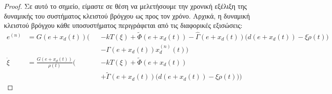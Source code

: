 \begin{proof}
Σε αυτό το σημείο, είμαστε σε θέση να μελετήσουμε την χρονική εξέλιξη της δυναμικής του συστήματος κλειστού βρόγχου ως προς τον χρόνο. Αρχικά, η δυναμική κλειστού βρόγχου κάθε υποσυστήματος περιγράφεται από τις διαφορικές εξισώσεις:
\begin{equation}
\begin{alignedat}{2}
	e^{(n)} &= G(e + x_d(t)) \Big( &&-k T(\xi ) 
	+ \tilde{\Phi}(e + x_d(t)) 
	-\hat{\Gamma}(e + x_d(t)) \big( d(e + x_d(t)) - \xi \dot{\rho}(t) \big)  \\
	& &&- \Gamma(e + x_d(t)) x_d^{(n)}(t) \Big)   \\
	\dot{\xi} &= \frac{G(e + x_d(t))}{\rho(t)} \Big( &&-k T(\xi ) + \tilde{\Phi}(e + x_d(t)) \\ 
	& &&+ \tilde{\Gamma}(e + x_d(t))\big( d(e + x_d(t)) - \xi \dot{\rho}(t) \big)  \Big)   
	\end{alignedat}
	\label{eq:aug_CL}
\end{equation}




\end{proof}
